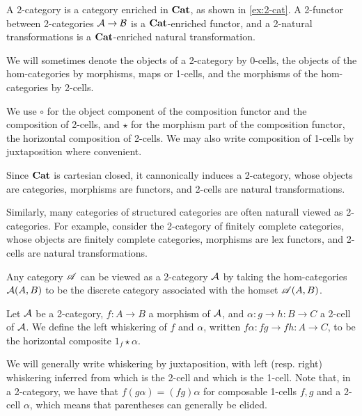 \documentclass[../thesis.tex]{subfiles}
\begin{document}
\begin{definition}[2-categories]
  A 2-category is a category enriched in ${\mathbf{Cat}}$, as shown in \cref{ex:2-cat}. A 2-functor between 2-categories ${\mathcal{A}} \to {\mathcal{B}}$
  is a ${\mathbf{Cat}}$-enriched functor, and a 2-natural transformations is a ${\mathbf{Cat}}$-enriched natural transformation.
\end{definition}

\begin{notation}
  We will sometimes denote the objects of a 2-category by 0-cells, the objects of the hom-categories by morphisms, maps or
  1-cells, and the morphisms of the hom-categories by 2-cells.

  We use $\circ$ for the object component of the composition functor and the composition of 2-cells, and $\star$ for the
  morphism part of the composition functor, the horizontal composition of 2-cells. We may also write composition of 1-cells
  by juxtaposition where convenient.
\end{notation}

\begin{example}
  Since ${\mathbf{Cat}}$ is cartesian closed, it cannonically induces a 2-category, whose objects are categories, morphisms are functors,
  and 2-cells are natural transformations.

  Similarly, many  categories of structured categories are often naturall viewed as 2-categories. For example, consider the
  2-category of finitely complete categories, whose objects are finitely complete categories, morphisms are lex functors, and
  2-cells are natural transformations.
\end{example}

\begin{example}
  Any category ${\mathscr{A}}$ can be viewed as a 2-category ${\mathcal{A}}$ by taking the hom-categories ${\mathcal{A}}(A,B)$ to be the discrete category
  associated with the homset ${\mathscr{A}}(A,B)$.
\end{example}

\begin{definition}[Whiskering]
  Let ${\mathcal{A}}$ be a 2-category, $f : A \to B$ a morphism of ${\mathcal{A}}$, and $\alpha : g \to h : B \to C$ a 2-cell of ${\mathcal{A}}$. We
  define the left whiskering of $f$ and $\alpha$, written $f\alpha : fg \to fh : A \to C$, to be the horizontal composite
  $1_f \star \alpha$.  
\end{definition}
\begin{notation}
  We will generally write whiskering by juxtaposition, with left (resp. right) whiskering inferred from which is the 2-cell
  and which is the 1-cell. Note that, in a 2-category, we have that $f(g\alpha) = (fg)\alpha$ for composable 1-cells $f,g$
  and a 2-cell $\alpha$, which means that parentheses can generally be elided.
\end{notation}
\end{document}
